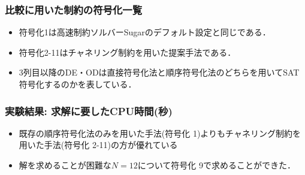\documentclass [dvipdfmx,11pt]{beamer}
\begin{document}
\begin{frame}
    \frametitle{比較に用いた{\alldiff}制約の符号化一覧}
    \begin{block}{}\centering
        {\tiny }
    \end{block}
    \begin{itemize}
        \item 符号化1は高速制約ソルバーSugarのデフォルト設定と同じである．
        \item 符号化2-11はチャネリング制約を用いた提案手法である．
        \item 3列目以降のDE・ODは直接符号化法と順序符号化法のどちらを用いてSAT符号化するのかを表している．
    \end{itemize}
\end{frame}



\begin{frame}
    \frametitle{実験結果: 求解に要したCPU時間(秒)}
    \begin{block}{}\centering
        {\tiny }
    \end{block}
    \begin{itemize}
        \item 既存の順序符号化法のみを用いた手法(符号化 1)よりもチャネリング制約を用いた手法(符号化 2-11)の方が優れている
        \item 解を求めることが困難な$N=12$について符号化 9で求めることができた．
    \end{itemize}
\end{frame}
\end{document}
